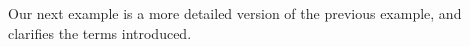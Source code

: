 \documentclass{sig-alternate}
\begin{document}


Our next example is a more detailed version of the previous example,
and clarifies the terms introduced.
\end{document}
